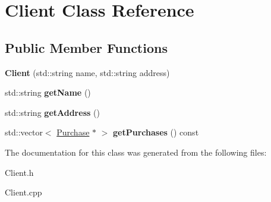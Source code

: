 \hypertarget{class_client}{}\section{Client Class Reference}
\label{class_client}
\subsection*{Public Member Functions}
\begin{DoxyCompactItemize}
\item 
\hypertarget{class_client_a3a4c924e7284595c251948e5d2720ee4}{}\label{class_client_a3a4c924e7284595c251948e5d2720ee4} 
{\bfseries Client} (std\+::string name, std\+::string address)
\item 
\hypertarget{class_client_a97aafccfd0a7679336ebebb6f1abbfa6}{}\label{class_client_a97aafccfd0a7679336ebebb6f1abbfa6} 
std\+::string {\bfseries get\+Name} ()
\item 
\hypertarget{class_client_ade921ee3793590346190508bc7604ffe}{}\label{class_client_ade921ee3793590346190508bc7604ffe} 
std\+::string {\bfseries get\+Address} ()
\item 
\hypertarget{class_client_a26f7d610afd9e94de5f95292e628d216}{}\label{class_client_a26f7d610afd9e94de5f95292e628d216} 
std\+::vector$<$ \hyperlink{class_purchase}{Purchase} $\ast$ $>$ {\bfseries get\+Purchases} () const
\end{DoxyCompactItemize}


The documentation for this class was generated from the following files\+:\begin{DoxyCompactItemize}
\item 
Client.\+h\item 
Client.\+cpp\end{DoxyCompactItemize}
